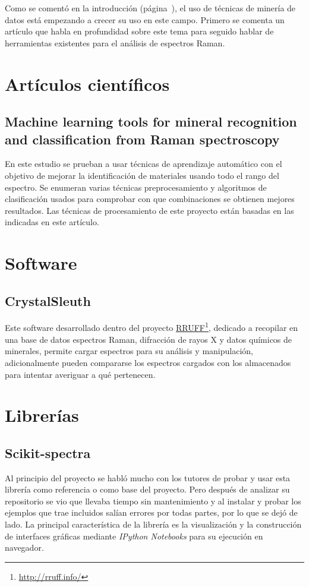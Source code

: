 
Como se comentó en la introducción (página~\pageref{ch:introduccion}), el uso de
técnicas de minería de datos está empezando a crecer su uso en este campo.
Primero se comenta un artículo que habla en profundidad sobre este tema para
seguido hablar de herramientas existentes para el análisis de espectros Raman.

\section{Artículos científicos}

\subsection{Machine learning tools for mineral recognition	and classification
	from Raman spectroscopy\cite{art:raman-carey}}\label{sec:carey}
En este estudio se prueban a usar técnicas de aprendizaje automático con el
objetivo de mejorar la identificación de materiales usando todo el rango del
espectro. Se enumeran varias técnicas preprocesamiento y algoritmos de
clasificación usados para comprobar con que combinaciones se obtienen mejores
resultados. Las técnicas de procesamiento de este proyecto están basadas en las
indicadas en este artículo.

\section{Software}

\subsection{CrystalSleuth}
Este software desarrollado dentro del proyecto 
\href{http://rruff.info/}{RRUFF}\footnote{\url{http://rruff.info/}}, dedicado a
recopilar en una base de datos espectros Raman, difracción de rayos X y datos
químicos de minerales, permite cargar espectros para su análisis y manipulación,
adicionalmente pueden compararse los espectros cargados con los almacenados para
intentar averiguar a qué pertenecen.

\section{Librerías}

\subsection{Scikit-spectra}
Al principio del proyecto se habló mucho con los tutores de probar y usar esta
librería como referencia o como base del proyecto. Pero después de analizar su
repositorio se vio que llevaba tiempo sin mantenimiento y al instalar y probar
los ejemplos que trae incluidos salían errores por todas partes, por lo que se
dejó de lado. La principal característica de la librería es la visualización y
la construcción de interfaces gráficas mediante \textit{IPython Notebooks} para
su ejecución en navegador\cite{art:skspec}.

